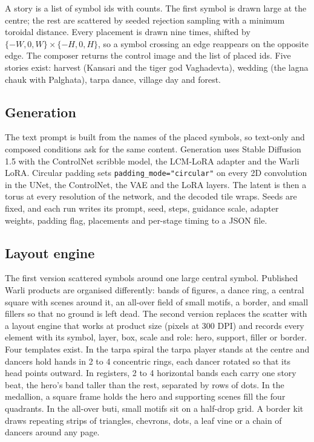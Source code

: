 \documentclass[conference]{IEEEtran}
\begin{document}
A story is a list of symbol ids with counts. The first symbol is drawn large at the centre; the rest are scattered by seeded rejection sampling with a minimum toroidal distance. Every placement is drawn nine times, shifted by $\{-W, 0, W\} \times \{-H, 0, H\}$, so a symbol crossing an edge reappears on the opposite edge. The composer returns the control image and the list of placed ids. Five stories exist: harvest (Kansari and the tiger god Vaghadevta), wedding (the lagna chauk with Palghata), tarpa dance, village day and forest.

\subsection{Generation}

The text prompt is built from the names of the placed symbols, so text-only and composed conditions ask for the same content. Generation uses Stable Diffusion 1.5 with the ControlNet scribble model, the LCM-LoRA adapter and the Warli LoRA. Circular padding sets \texttt{padding\_mode="circular"} on every 2D convolution in the UNet, the ControlNet, the VAE and the LoRA layers. The latent is then a torus at every resolution of the network, and the decoded tile wraps. Seeds are fixed, and each run writes its prompt, seed, steps, guidance scale, adapter weights, padding flag, placements and per-stage timing to a JSON file.

\subsection{Layout engine}

The first version scattered symbols around one large central symbol. Published Warli products are organised differently: bands of figures, a dance ring, a central square with scenes around it, an all-over field of small motifs, a border, and small fillers so that no ground is left dead. The second version replaces the scatter with a layout engine that works at product size (pixels at 300 DPI) and records every element with its symbol, layer, box, scale and role: hero, support, filler or border. Four templates exist. In the tarpa spiral the tarpa player stands at the centre and dancers hold hands in 2 to 4 concentric rings, each dancer rotated so that its head points outward. In registers, 2 to 4 horizontal bands each carry one story beat, the hero's band taller than the rest, separated by rows of dots. In the medallion, a square frame holds the hero and supporting scenes fill the four quadrants. In the all-over buti, small motifs sit on a half-drop grid. A border kit draws repeating strips of triangles, chevrons, dots, a leaf vine or a chain of dancers around any page.
\end{document}
